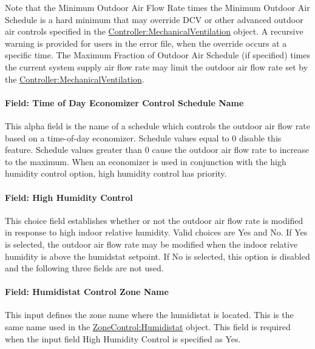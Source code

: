 Note that the Minimum Outdoor Air Flow Rate times the Minimum Outdoor Air Schedule is a hard minimum that may override DCV or other advanced outdoor air controls specified in the \hyperref[controllermechanicalventilation]{Controller:MechanicalVentilation} object.  A recursive warning is provided for users in the error file, when the override occurs at a specific time. The Maximum Fraction of Outdoor Air Schedule (if specified) times the current system supply air flow rate may limit the outdoor air flow rate set by the \hyperref[controllermechanicalventilation]{Controller:MechanicalVentilation}.

\paragraph{Field: Time of Day Economizer Control Schedule Name}\label{field-time-of-day-economizer-control-schedule-name}

This alpha field is the name of a schedule which controls the outdoor air flow rate based on a time-of-day economizer. Schedule values equal to 0 disable this feature. Schedule values greater than 0 cause the outdoor air flow rate to increase to the maximum. When an economizer is used in conjunction with the high humidity control option, high humidity control has priority.

\paragraph{Field: High Humidity Control}\label{field-high-humidity-control}

This choice field establishes whether or not the outdoor air flow rate is modified in response to high indoor relative humidity. Valid choices are Yes and No. If Yes is selected, the outdoor air flow rate may be modified when the indoor relative humidity is above the humidstat setpoint. If No is selected, this option is disabled and the following three fields are not used.

\paragraph{Field: Humidistat Control Zone Name}\label{field-humidistat-control-zone-name}

This input defines the zone name where the humidistat is located. This is the same name used in the \hyperref[zonecontrolhumidistat]{ZoneControl:Humidistat} object. This field is required when the input field High Humidity Control is specified as Yes.

